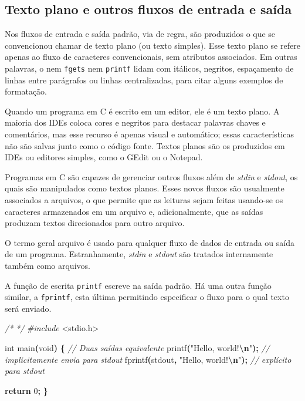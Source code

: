 \documentclass[
  11pt,
  a4paper,
]{scrbook}
\newenvironment{Shaded}{\begin{snugshade}}{\end{snugshade}}
\newcommand{\CommentTok}[1]{\textcolor[rgb]{0.56,0.35,0.01}{\textit{#1}}}
\newcommand{\ControlFlowTok}[1]{\textcolor[rgb]{0.13,0.29,0.53}{\textbf{#1}}}
\newcommand{\DataTypeTok}[1]{\textcolor[rgb]{0.13,0.29,0.53}{#1}}
\newcommand{\DecValTok}[1]{\textcolor[rgb]{0.00,0.00,0.81}{#1}}
\newcommand{\ImportTok}[1]{#1}
\newcommand{\NormalTok}[1]{#1}
\newcommand{\OperatorTok}[1]{\textcolor[rgb]{0.81,0.36,0.00}{\textbf{#1}}}
\newcommand{\PreprocessorTok}[1]{\textcolor[rgb]{0.56,0.35,0.01}{\textit{#1}}}
\newcommand{\SpecialCharTok}[1]{\textcolor[rgb]{0.81,0.36,0.00}{\textbf{#1}}}
\newcommand{\StringTok}[1]{\textcolor[rgb]{0.31,0.60,0.02}{#1}}
\begin{document}
\subsection{Texto plano e outros fluxos de entrada e
saída}\label{texto-plano-e-outros-fluxos-de-entrada-e-sauxedda}

Nos fluxos de entrada e saída padrão, via de regra, são produzidos o que
se convencionou chamar de texto plano (ou texto simples). Esse texto
plano se refere apenas ao fluxo de caracteres convencionais, sem
atributos associados. Em outras palavras, o nem \texttt{fgets} nem
\texttt{printf} lidam com itálicos, negritos, espaçamento de linhas
entre parágrafos ou linhas centralizadas, para citar alguns exemplos de
formatação.

Quando um programa em C é escrito em um editor, ele é um texto plano. A
maioria dos IDEs coloca cores e negritos para destacar palavras chaves e
comentários, mas esse recurso é apenas visual e automático; essas
características não são salvas junto como o código fonte. Textos planos
são os produzidos em IDEs ou editores simples, como o GEdit ou o
Notepad.

Programas em C são capazes de gerenciar outros fluxos além de
\emph{stdin} e \emph{stdout}, os quais são manipulados como textos
planos. Esses novos fluxos são usualmente associados a arquivos, o que
permite que as leituras sejam feitas usando-se os caracteres armazenados
em um arquivo e, adicionalmente, que as saídas produzam textos
direcionados para outro arquivo.

O termo geral arquivo é usado para qualquer fluxo de dados de entrada ou
saída de um programa. Estranhamente, \emph{stdin} e \emph{stdout} são
tratados internamente também como arquivos.

 A função de escrita \texttt{printf}
escreve na saída padrão. Há uma outra função similar, a
\texttt{fprintf}, esta última permitindo especificar o fluxo para o qual
texto será enviado.

\begin{Shaded}
\begin{Highlighting}[]
\CommentTok{/*}
\CommentTok{*/}
\PreprocessorTok{\#include }\ImportTok{\textless{}stdio.h\textgreater{}}

\DataTypeTok{int}\NormalTok{ main}\OperatorTok{(}\DataTypeTok{void}\OperatorTok{)} \OperatorTok{\{}
    \CommentTok{// Duas saídas equivalente}
\NormalTok{    printf}\OperatorTok{(}\StringTok{"Hello, world!}\SpecialCharTok{\textbackslash{}n}\StringTok{"}\OperatorTok{);}  \CommentTok{// implicitamente envia para stdout}
\NormalTok{    fprintf}\OperatorTok{(}\NormalTok{stdout}\OperatorTok{,} \StringTok{"Hello, world!}\SpecialCharTok{\textbackslash{}n}\StringTok{"}\OperatorTok{);} \CommentTok{// explícito para stdout}

    \ControlFlowTok{return} \DecValTok{0}\OperatorTok{;}
\OperatorTok{\}}
\end{Highlighting}
\end{Shaded}
\end{document}
